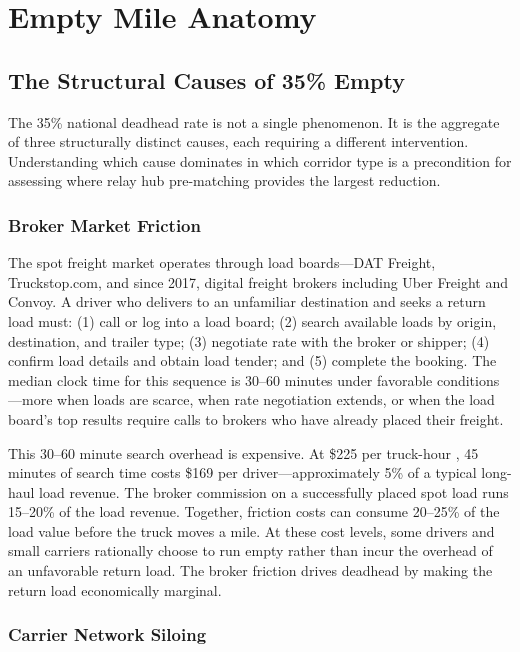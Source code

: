 \section{Empty Mile Anatomy}
\label{sec:anatomy}

\subsection{The Structural Causes of 35\% Empty}

The 35\% national deadhead rate is not a single phenomenon. It is the aggregate of three structurally distinct causes, each requiring a different intervention. Understanding which cause dominates in which corridor type is a precondition for assessing where relay hub pre-matching provides the largest reduction.

\subsubsection{Broker Market Friction}

The spot freight market operates through load boards---DAT Freight, Truckstop.com, and since 2017, digital freight brokers including Uber Freight and Convoy. A driver who delivers to an unfamiliar destination and seeks a return load must: (1) call or log into a load board; (2) search available loads by origin, destination, and trailer type; (3) negotiate rate with the broker or shipper; (4) confirm load details and obtain load tender; and (5) complete the booking. The median clock time for this sequence is 30--60 minutes under favorable conditions---more when loads are scarce, when rate negotiation extends, or when the load board's top results require calls to brokers who have already placed their freight.

This 30--60 minute search overhead is expensive. At \$225 per truck-hour \citep{ATRI_costs2024}, 45 minutes of search time costs \$169 per driver---approximately 5\% of a typical long-haul load revenue. The broker commission on a successfully placed spot load runs 15--20\% of the load revenue. Together, friction costs can consume 20--25\% of the load value before the truck moves a mile. At these cost levels, some drivers and small carriers rationally choose to run empty rather than incur the overhead of an unfavorable return load. The broker friction drives deadhead by making the return load economically marginal.

\subsubsection{Carrier Network Siloing}

